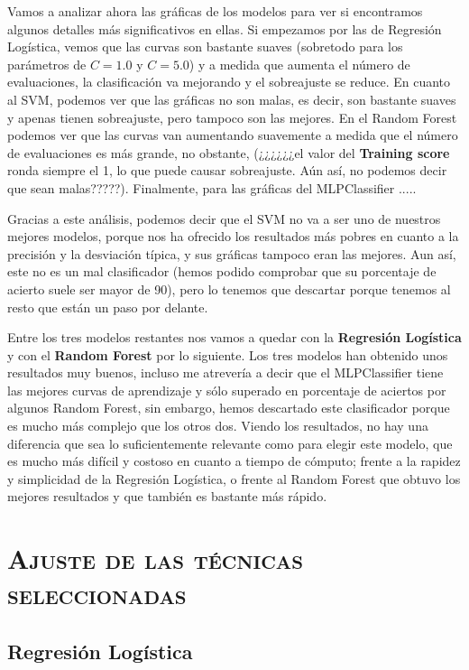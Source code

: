 \documentclass[11pt,a4paper]{article}
\begin{document}
Vamos a analizar ahora las gráficas de los modelos para ver si encontramos algunos detalles más significativos en ellas. Si empezamos por las de Regresión Logística, vemos que las curvas son bastante suaves (sobretodo para los parámetros de $C = 1.0$ y $C = 5.0$) y a medida que aumenta el número de evaluaciones, la clasificación va mejorando y el sobreajuste se reduce. En cuanto al SVM, podemos ver que las gráficas no son malas, es decir, son bastante suaves y apenas tienen sobreajuste, pero tampoco son las mejores. En el Random Forest podemos ver que las curvas van aumentando suavemente a medida que el número de evaluaciones es más grande, no obstante, (¿¿¿¿¿¿el valor del \textbf{Training score} ronda siempre el 1, lo que puede causar sobreajuste. Aún así, no podemos decir que sean malas?????). Finalmente, para las gráficas del MLPClassifier .....

Gracias a este análisis, podemos decir que el SVM no va a ser uno de nuestros mejores modelos, porque nos ha ofrecido los resultados más pobres en cuanto a la precisión y la desviación típica, y sus gráficas tampoco eran las mejores. Aun así, este no es un mal clasificador (hemos podido comprobar que su porcentaje de acierto suele ser mayor de 90), pero lo tenemos que descartar porque tenemos al resto que están un paso por delante.

Entre los tres modelos restantes nos vamos a quedar con la \textbf{Regresión Logística} y con el \textbf{Random Forest} por lo siguiente. Los tres modelos han obtenido unos resultados muy buenos, incluso me atrevería a decir que el MLPClassifier tiene las mejores curvas de aprendizaje y sólo superado en porcentaje de aciertos por algunos Random Forest, sin embargo, hemos descartado este clasificador porque es mucho más complejo que los otros dos. Viendo los resultados, no hay una diferencia que sea lo suficientemente relevante como para elegir este modelo, que es mucho más difícil y costoso en cuanto a tiempo de cómputo; frente a la rapidez y simplicidad de la Regresión Logística, o frente al Random Forest que obtuvo los mejores resultados y que también es bastante más rápido.

\section{\textsc{Ajuste de las técnicas seleccionadas}}

\subsection{Regresión Logística}
\end{document}
